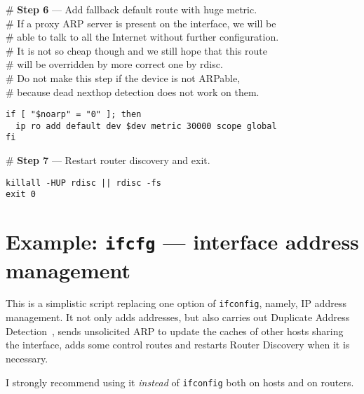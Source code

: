 \begin{flushleft}
\# {\bf Step 6} --- Add fallback default route with huge metric.\\
\# If a proxy ARP server is present on the interface, we will be\\
\# able to talk to all the Internet without further configuration.\\
\# It is not so cheap though and we still hope that this route\\
\# will be overridden by more correct one by rdisc.\\
\# Do not make this step if the device is not ARPable,\\
\# because dead nexthop detection does not work on them.
\end{flushleft}
\begin{verbatim}
if [ "$noarp" = "0" ]; then
  ip ro add default dev $dev metric 30000 scope global
fi
\end{verbatim}

\begin{flushleft}
\# {\bf Step 7} --- Restart router discovery and exit.
\end{flushleft}
\begin{verbatim}
killall -HUP rdisc || rdisc -fs
exit 0
\end{verbatim}


\section{Example: {\protect\tt ifcfg} --- interface address management}
\label{EXAMPLE-IFCFG}

This is a simplistic script replacing one option of \verb|ifconfig|,
namely, IP address management. It not only adds
addresses, but also carries out Duplicate Address Detection~\cite{RFC-DHCP},
sends unsolicited ARP to update the caches of other hosts sharing
the interface, adds some control routes and restarts Router Discovery
when it is necessary.

I strongly recommend using it {\em instead\/} of \verb|ifconfig| both
on hosts and on routers.

